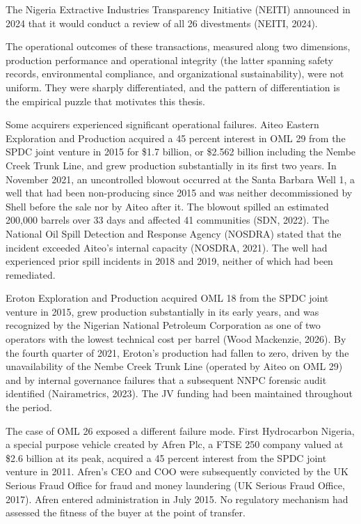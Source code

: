 The Nigeria Extractive Industries Transparency Initiative (NEITI)
announced in 2024 that it would conduct a review of all 26 divestments
(NEITI, 2024).

The operational outcomes of these transactions, measured along two
dimensions, production performance and operational integrity (the latter
spanning safety records, environmental compliance, and organizational
sustainability), were not uniform. They were sharply differentiated, and
the pattern of differentiation is the empirical puzzle that motivates
this thesis.

Some acquirers experienced significant operational failures. Aiteo
Eastern Exploration and Production acquired a 45 percent interest in OML
29 from the SPDC joint venture in 2015 for \$1.7 billion, or \$2.562
billion including the Nembe Creek Trunk Line, and grew production
substantially in its first two years. In November 2021, an uncontrolled
blowout occurred at the Santa Barbara Well 1, a well that had been
non-producing since 2015 and was neither decommissioned by Shell before
the sale nor by Aiteo after it. The blowout spilled an estimated 200,000
barrels over 33 days and affected 41 communities (SDN, 2022). The
National Oil Spill Detection and Response Agency (NOSDRA) stated that
the incident exceeded Aiteo's internal capacity (NOSDRA, 2021). The well
had experienced prior spill incidents in 2018 and 2019, neither of which
had been remediated.

Eroton Exploration and Production acquired OML 18 from the SPDC joint
venture in 2015, grew production substantially in its early years, and
was recognized by the Nigerian National Petroleum Corporation as one of
two operators with the lowest technical cost per barrel (Wood Mackenzie,
2026). By the fourth quarter of 2021, Eroton's production had fallen to
zero, driven by the unavailability of the Nembe Creek Trunk Line
(operated by Aiteo on OML 29) and by internal governance failures that a
subsequent NNPC forensic audit identified (Nairametrics, 2023). The JV
funding had been maintained throughout the period.

The case of OML 26 exposed a different failure mode. First Hydrocarbon
Nigeria, a special purpose vehicle created by Afren Plc, a FTSE 250
company valued at \$2.6 billion at its peak, acquired a 45 percent
interest from the SPDC joint venture in 2011. Afren's CEO and COO were
subsequently convicted by the UK Serious Fraud Office for fraud and
money laundering (UK Serious Fraud Office, 2017). Afren entered
administration in July 2015. No regulatory mechanism had assessed the
fitness of the buyer at the point of transfer.

